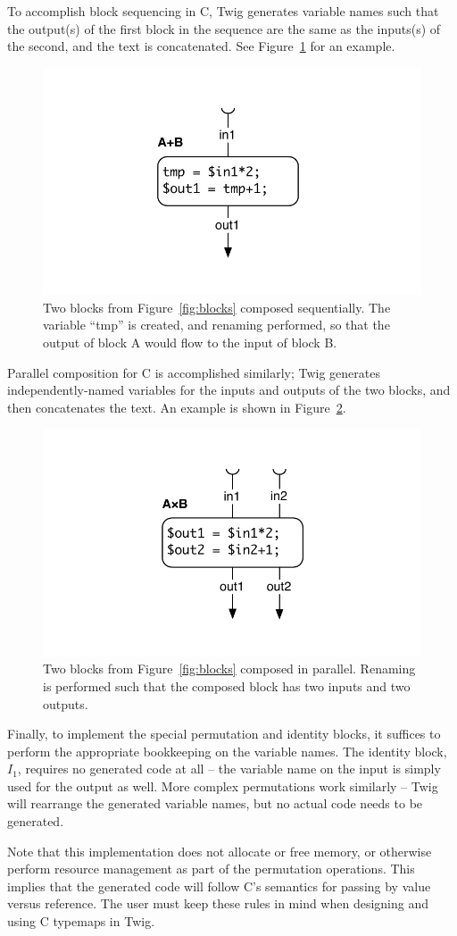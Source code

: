 To accomplish block sequencing in C, Twig generates variable names such that the output(s) of the first block in the sequence are the same as the inputs(s) of the second, and the text is concatenated. See Figure~\ref{fig:codegen-seq} for an example.

\begin{figure}[ht]
\centering
\includegraphics[width=0.75\columnwidth]{images/code-gen2}
\caption{Two blocks from Figure~\ref{fig:blocks} composed sequentially. The variable ``tmp'' is created, and renaming performed, so that the output of block A would flow to the input of block B.}
\label{fig:codegen-seq}
\end{figure}

Parallel composition for C is accomplished similarly; Twig generates independently-named variables for the inputs and outputs of the two blocks, and then concatenates the text. An example is shown in Figure~\ref{fig:codegen-par}.

\begin{figure}[ht]
\centering
\includegraphics[width=0.75\columnwidth]{images/code-gen3}
\caption{Two blocks from Figure~\ref{fig:blocks} composed in parallel. Renaming is performed such that the composed block has two inputs and two outputs.}
\label{fig:codegen-par}
\end{figure}

Finally, to implement the special permutation and identity blocks, it suffices to perform the appropriate bookkeeping on the variable names. The identity block, $I_1$, requires no generated code at all -- the variable name on the input is simply used for the output as well. More complex permutations work similarly -- Twig will rearrange the generated variable names, but no actual code needs to be generated.

Note that this implementation does not allocate or free memory, or otherwise perform resource management as part of the permutation operations. This implies that the generated code will follow C's semantics for passing by value versus reference. The user must keep these rules in mind when designing and using C typemaps in Twig.
